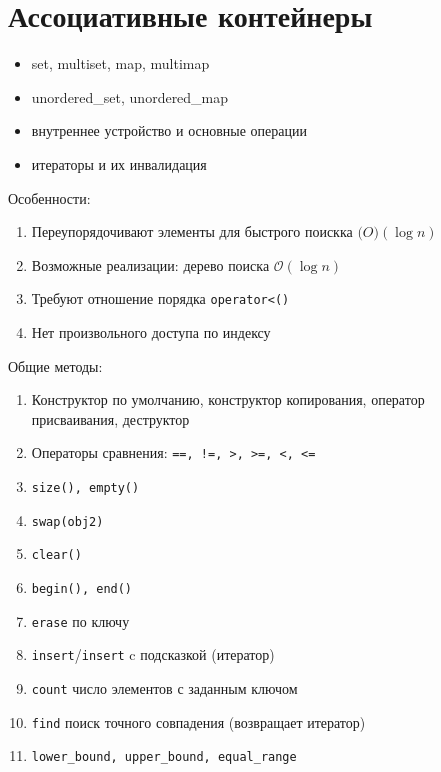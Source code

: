 \section{Ассоциативные контейнеры}
\begin{itemize}[noitemsep]
	\item set, multiset, map, multimap
	\item unordered\_set, unordered\_map
	\item внутреннее устройство и основные операции
	\item итераторы и их инвалидация
\end{itemize}
Особенности:
\begin{enumerate}[noitemsep]
	\item Переупорядочивают элементы для быстрого поискка $ \mathcal(O)(\log n)$ 
	\item Возможные реализации: дерево поиска $ \mathcal{O}(\log n)$ 
	\item Требуют отношение порядка \texttt{operator<()}
	\item Нет произвольного доступа по индексу
\end{enumerate} 
Общие методы:
\begin{enumerate}[noitemsep]
    \item Конструктор по умолчанию, конструктор копирования, оператор присваивания, деструктор
	\item Операторы сравнения: \texttt{==, !=,   >, >=, <, <=}
	\item \texttt{size(), empty()}
	\item \texttt{swap(obj2)}
	\item \texttt{clear()}
	\item \texttt{begin(), end()}
	\item \texttt{erase} по ключу
	\item \texttt{insert}/\texttt{insert} c подсказкой (итератор)
	\item \texttt{count} число элементов с заданным ключом
	\item \texttt{find} поиск точного совпадения (возвращает  итератор)
	\item \texttt{lower\_bound, upper\_bound, equal\_range} 
\end{enumerate} 
